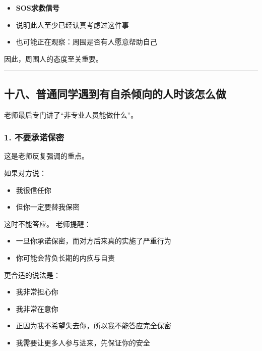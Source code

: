 \documentclass[
  chinese,
  9pt,
  a4paper,
]{ctexart}
\providecommand{\tightlist}{%
  \setlength{\itemsep}{0pt}\setlength{\parskip}{0pt}}
\begin{document}
\begin{itemize}
\tightlist
\item
  \textbf{SOS求救信号}
\item
  说明此人至少已经认真考虑过这件事
\item
  也可能正在观察：周围是否有人愿意帮助自己
\end{itemize}

因此，周围人的态度至关重要。

\begin{center}\rule{0.5\linewidth}{0.5pt}\end{center}

\subsection{十八、普通同学遇到有自杀倾向的人时该怎么做}\label{ux5341ux516bux666eux901aux540cux5b66ux9047ux5230ux6709ux81eaux6740ux503eux5411ux7684ux4ebaux65f6ux8be5ux600eux4e48ux505a}

老师最后专门讲了``非专业人员能做什么''。

\subsubsection{1.
不要承诺保密}\label{ux4e0dux8981ux627fux8bfaux4fddux5bc6}

这是老师反复强调的重点。

如果对方说：

\begin{itemize}
\tightlist
\item
  我很信任你
\item
  但你一定要替我保密
\end{itemize}

这时不能答应。 老师提醒：

\begin{itemize}
\tightlist
\item
  一旦你承诺保密，而对方后来真的实施了严重行为
\item
  你可能会背负长期的内疚与自责
\end{itemize}

更合适的说法是：

\begin{itemize}
\tightlist
\item
  我非常担心你
\item
  我非常在意你
\item
  正因为我不希望失去你，所以我不能答应完全保密
\item
  我需要让更多人参与进来，先保证你的安全
\end{itemize}
\end{document}
